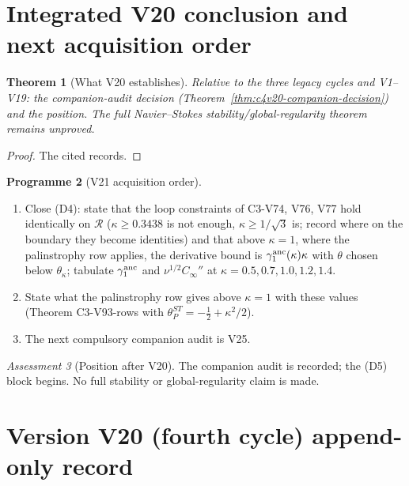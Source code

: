\documentclass[11pt]{article}
\theoremstyle{plain}
\newtheorem{theorem}{Theorem}[section]
\theoremstyle{definition}
\newtheorem{programme}[theorem]{Programme}
\theoremstyle{remark}
\newtheorem{assessment}[theorem]{Assessment}
\begin{document}
\section{Integrated V20 conclusion and next acquisition order}
\label{sec:c4v20-conclusion}

\begin{theorem}[What V20 establishes]
\label{thm:c4v20-conclusion}
Relative to the three legacy cycles and V1--V19: the companion-audit
decision (Theorem~\ref{thm:c4v20-companion-decision}) and the position.
The full Navier--Stokes stability/global-regularity theorem remains
unproved.
\end{theorem}

\begin{proof}
The cited records.
\end{proof}

\begin{programme}[V21 acquisition order]
\label{prog:c4v21}
\begin{enumerate}[label=\textup{(AC\arabic*)},leftmargin=4.8em]
\item Close (D4): state that the loop constraints of C3-V74, V76, V77
      hold identically on \(\mathcal R\) (\(\kappa\ge0.3438\) is not enough, \(\kappa\ge1/\sqrt3\) is;
      record where on the boundary they become identities) and that
      above \(\kappa=1\), where the palinstrophy row applies, the derivative
      bound is \(\gamma_1^{\rm anc}(\kappa)\kappa\) with \(\theta\) chosen below \(\theta_\kappa\); tabulate
      \(\gamma_1^{\rm anc}\) and \(\nu^{1/2}C_\infty''\) at \(\kappa=0.5,0.7,1.0,1.2,1.4\).
\item State what the palinstrophy row gives above \(\kappa=1\) with these
      values (Theorem C3-V93-rows with \(\theta_P^{ST}=-\frac12+\kappa^2/2\)).
\item The next compulsory companion audit is V25.
\end{enumerate}
\end{programme}

\begin{assessment}[Position after V20]
\label{ass:c4v20-position}
The companion audit is recorded; the (D5) block begins.  No full
stability or global-regularity claim is made.
\end{assessment}

\section*{Version V20 (fourth cycle) append-only record}
\end{document}
